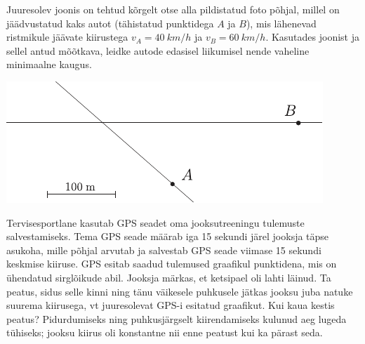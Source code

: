 \documentclass[10pt]{article}
\begin{document}
{%

Juuresolev joonis on tehtud kõrgelt otse alla pildistatud foto põhjal, millel on jäädvustatud kaks autot (tähistatud punktidega $A$ ja $B$), mis lähenevad ristmikule jäävate kiirustega $v_A = \SI{40}{km/h}$ ja $v_B = \SI{60}{km/h}$. Kasutades joonist ja sellel antud mõõtkava, leidke autode edasisel liikumisel nende vaheline minimaalne kaugus.

\begin{center}
	\includegraphics[width=0.9\linewidth]{2008-v2g-02-yl}
\end{center}
\probend
\bigskip


Tervisesportlane kasutab GPS seadet oma jooksutreeningu tulemuste salvestamiseks.
Tema GPS seade määrab iga 15 sekundi järel jooksja täpse asukoha, mille põhjal arvutab ja salvestab GPS seade viimase 15 sekundi keskmise kiiruse.
GPS esitab saadud tulemused graafikul punktidena, mis on ühendatud sirglõikude abil.
Jooksja märkas, et ketsipael oli lahti läinud.
Ta peatus, sidus selle kinni ning tänu väikesele puhkusele jätkas jooksu juba natuke suurema
kiirusega, vt juuresolevat GPS-i esitatud graafikut. Kui kaua kestis peatus? Pidurdumiseks ning puhkusjärgselt kiirendamiseks kulunud
aeg lugeda tühiseks; jooksu kiirus oli konstantne nii enne peatust kui ka pärast seda.

}
\end{document}
